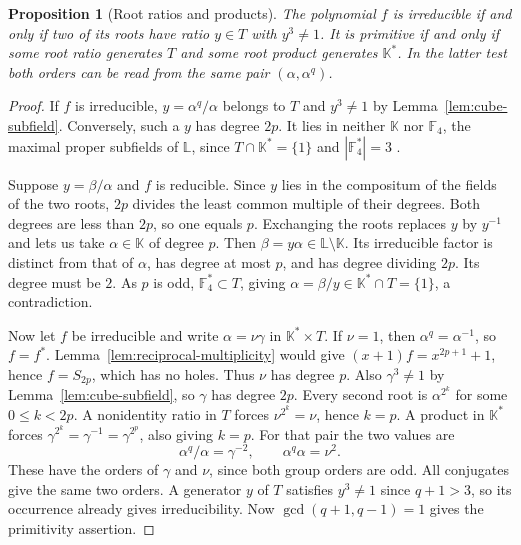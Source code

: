 \documentclass[11pt]{article}
\newtheorem{proposition}{Proposition}[section]
\theoremstyle{definition}
\theoremstyle{remark}
\begin{document}
\begin{proposition}[Root ratios and products]\label{prop:root-pairs}
The polynomial $f$ is irreducible if and only if two of its roots
have ratio $y\in T$ with $y^3\ne1$. It is primitive if and only if
some root ratio generates $T$ and some root product generates
$\mathbb K^*$. In the latter test both orders can be read from
the same pair $(\alpha,\alpha^q)$.
\end{proposition}
\begin{proof}
If $f$ is irreducible, $y=\alpha^q/\alpha$ belongs to $T$ and
$y^3\ne1$ by Lemma~\ref{lem:cube-subfield}. Conversely, such a $y$
has degree $2p$. It lies in neither $\mathbb K$ nor $\mathbb F_4$,
the maximal proper subfields of $\mathbb L$, since
$T\cap\mathbb K^*=\{1\}$ and $|\mathbb F_4^*|=3$ \cite[Chapter~2]{LN}.

Suppose $y=\beta/\alpha$ and $f$ is reducible. Since $y$ lies in
the compositum of the fields of the two roots, $2p$ divides the
least common multiple of their degrees. Both degrees are less than
$2p$, so one equals $p$. Exchanging the roots replaces $y$ by
$y^{-1}$ and lets us take $\alpha\in\mathbb K$ of degree $p$.
Then $\beta=y\alpha\in\mathbb L\setminus\mathbb K$. Its irreducible
factor is distinct from that of $\alpha$, has degree at most $p$,
and has degree dividing $2p$. Its degree must be $2$. As $p$ is odd,
$\mathbb F_4^*\subset T$, giving
$\alpha=\beta/y\in\mathbb K^*\cap T=\{1\}$, a contradiction.

Now let $f$ be irreducible and write $\alpha=\nu\gamma$ in
$\mathbb K^*\times T$. If $\nu=1$, then $\alpha^q=\alpha^{-1}$,
so $f=f^*$. Lemma~\ref{lem:reciprocal-multiplicity} would give
$(x+1)f=x^{2p+1}+1$, hence $f=S_{2p}$, which has no holes.
Thus $\nu$ has degree $p$. Also $\gamma^3\ne1$ by
Lemma~\ref{lem:cube-subfield}, so $\gamma$ has degree $2p$.
Every second root is $\alpha^{2^k}$ for some $0\le k<2p$.
A nonidentity ratio in $T$ forces $\nu^{2^k}=\nu$, hence $k=p$.
A product in $\mathbb K^*$ forces
$\gamma^{2^k}=\gamma^{-1}=\gamma^{2^p}$, also giving $k=p$.
For that pair the two values are
\[
 \alpha^q/\alpha=\gamma^{-2},\qquad \alpha^q\alpha=\nu^2 .
\]
These have the orders of $\gamma$ and $\nu$, since both group orders
are odd. All conjugates give the same two orders. A generator $y$ of $T$
satisfies $y^3\ne1$ since $q+1>3$, so its occurrence already gives
irreducibility. Now $\gcd(q+1,q-1)=1$ gives the primitivity assertion.
\end{proof}
\end{document}
